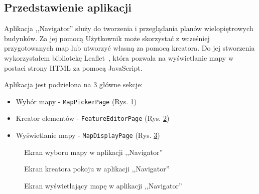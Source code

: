 \subsection{Przedstawienie aplikacji}

Aplikacja ,,Navigator'' służy do tworzenia i przeglądania planów wielopiętrowych budynków.
Za jej pomocą Użytkownik może skorzystać z wcześniej przygotowanych map lub utworzyć własną za pomocą kreatora.
Do jej stworzenia wykorzystałem bibliotekę Leaflet~\cite{leafletGithub}, 
która pozwala na wyświetlanie mapy w postaci strony HTML za pomocą JavaScript.

Aplikacja jest podzielona na 3 główne sekcje: 
\begin{itemize}
    \item Wybór mapy - \verb|MapPickerPage| (Rys. \ref{img:MapPickerPage})
    \item Kreator elementów - \verb|FeatureEditorPage| (Rys. \ref{img:FeatureEditorPage})
    \item Wyświetlanie mapy - \verb|MapDisplayPage| (Rys. \ref{img:MapDisplayPage})
\end{itemize}

\begin{figure}[hb]
    \centering
    \caption{Ekran wyboru mapy w aplikacji ,,Navigator''}
    \label{img:MapPickerPage}
\end{figure}
\clearpage
{}
\begin{figure}[ht]
    \centering
    \caption{Ekran kreatora pokoju w aplikacji ,,Navigator''}
    \label{img:FeatureEditorPage}
\end{figure}


\begin{figure}[H]
    \centering
    \caption{Ekran wyświetlający mapę w aplikacji ,,Navigator''}
    \label{img:MapDisplayPage}
\end{figure}
\restoregeometry
